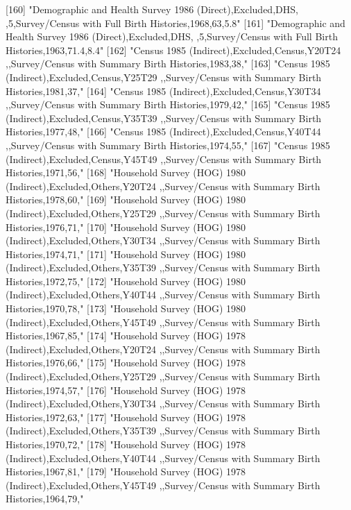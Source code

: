 [160] "Demographic and Health Survey 1986 (Direct),Excluded,DHS, ,5,Survey/Census with Full Birth Histories,1968,63,5.8"             
[161] "Demographic and Health Survey 1986 (Direct),Excluded,DHS, ,5,Survey/Census with Full Birth Histories,1963,71.4,8.4"           
[162] "Census 1985 (Indirect),Excluded,Census,Y20T24 ,,Survey/Census with Summary Birth Histories,1983,38,"                          
[163] "Census 1985 (Indirect),Excluded,Census,Y25T29 ,,Survey/Census with Summary Birth Histories,1981,37,"                          
[164] "Census 1985 (Indirect),Excluded,Census,Y30T34 ,,Survey/Census with Summary Birth Histories,1979,42,"                          
[165] "Census 1985 (Indirect),Excluded,Census,Y35T39 ,,Survey/Census with Summary Birth Histories,1977,48,"                          
[166] "Census 1985 (Indirect),Excluded,Census,Y40T44 ,,Survey/Census with Summary Birth Histories,1974,55,"                          
[167] "Census 1985 (Indirect),Excluded,Census,Y45T49 ,,Survey/Census with Summary Birth Histories,1971,56,"                          
[168] "Household Survey (HOG) 1980 (Indirect),Excluded,Others,Y20T24 ,,Survey/Census with Summary Birth Histories,1978,60,"          
[169] "Household Survey (HOG) 1980 (Indirect),Excluded,Others,Y25T29 ,,Survey/Census with Summary Birth Histories,1976,71,"          
[170] "Household Survey (HOG) 1980 (Indirect),Excluded,Others,Y30T34 ,,Survey/Census with Summary Birth Histories,1974,71,"          
[171] "Household Survey (HOG) 1980 (Indirect),Excluded,Others,Y35T39 ,,Survey/Census with Summary Birth Histories,1972,75,"          
[172] "Household Survey (HOG) 1980 (Indirect),Excluded,Others,Y40T44 ,,Survey/Census with Summary Birth Histories,1970,78,"          
[173] "Household Survey (HOG) 1980 (Indirect),Excluded,Others,Y45T49 ,,Survey/Census with Summary Birth Histories,1967,85,"          
[174] "Household Survey (HOG) 1978 (Indirect),Excluded,Others,Y20T24 ,,Survey/Census with Summary Birth Histories,1976,66,"          
[175] "Household Survey (HOG) 1978 (Indirect),Excluded,Others,Y25T29 ,,Survey/Census with Summary Birth Histories,1974,57,"          
[176] "Household Survey (HOG) 1978 (Indirect),Excluded,Others,Y30T34 ,,Survey/Census with Summary Birth Histories,1972,63,"          
[177] "Household Survey (HOG) 1978 (Indirect),Excluded,Others,Y35T39 ,,Survey/Census with Summary Birth Histories,1970,72,"          
[178] "Household Survey (HOG) 1978 (Indirect),Excluded,Others,Y40T44 ,,Survey/Census with Summary Birth Histories,1967,81,"          
[179] "Household Survey (HOG) 1978 (Indirect),Excluded,Others,Y45T49 ,,Survey/Census with Summary Birth Histories,1964,79,"          

